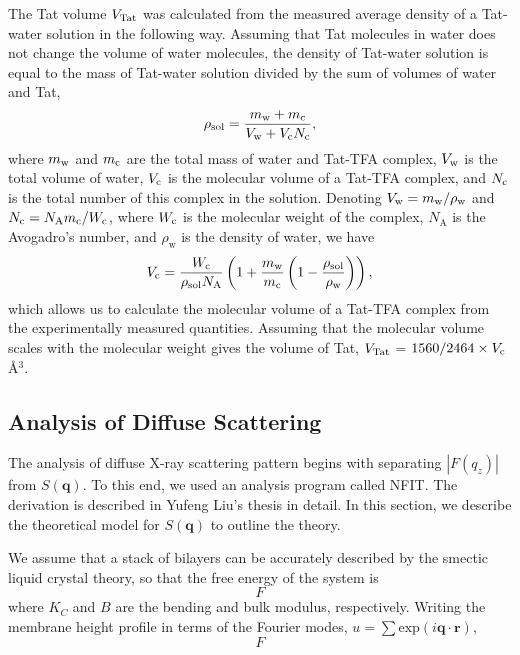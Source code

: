 The Tat volume $V_\textrm{Tat}$ was calculated from the measured average density of a 
Tat-water solution in the following way. Assuming that Tat
molecules in water does not change the volume of water molecules, the density
of Tat-water solution is equal to the mass of Tat-water solution divided
by the sum of volumes of water and Tat, 
\begin{equation}
  \rho_\textrm{sol} = \frac{m_\textrm{w}+m_\textrm{c}}{V_\textrm{w}+V_\textrm{c}N_\textrm{c}},
\end{equation}
where $m_\textrm{w}$ and 
$m_\textrm{c}$
are the total mass of water and Tat-TFA complex, $V_\textrm{w}$ is the total volume of 
water, $V_\textrm{c}$ is the molecular volume of a Tat-TFA complex, and $N_\textrm{c}$ is the total number 
of this complex in the solution. 
Denoting $V_\textrm{w}=m_\textrm{w}/\rho_\textrm{w}$ 
and $N_\textrm{c}=N_\textrm{A}m_\textrm{c}/W_\textrm{c}$, 
where $W_\textrm{c}$ is the molecular weight of the complex, 
$N_\textrm{A}$ is the Avogadro's number,
and $\rho_\textrm{w}$ is the density of water, we have
\begin{equation}
  V_\textrm{c} = \frac{W_\textrm{c}}{\rho_\textrm{sol}N_\textrm{A}} \left( 
        1 + \frac{m_\textrm{w}}{m_\textrm{c}}\left(1-\frac{\rho_\textrm{sol}}{\rho_\textrm{w}}\right) 
        \right),
\end{equation}
which allows us to calculate the molecular volume of a Tat-TFA complex 
from the experimentally measured quantities. 
Assuming that the molecular
volume scales with the molecular weight gives the volume of Tat, 
$V_\textrm{Tat}$ = $1560/2464\times V_\textrm{c}$ \AA$^3$. 

\subsection{Analysis of Diffuse Scattering}
The analysis of diffuse X-ray scattering pattern begins with separating 
$|F(q_z)|$ from $S(\mathbf{q})$. To this end, we used an analysis program
called NFIT. The derivation is described in Yufeng Liu's thesis in detail. 
In this section, we describe the theoretical model for $S(\mathbf{q})$ to 
outline the theory. 

We assume that a stack of bilayers can be accurately
described by the smectic liquid crystal theory, so that the free energy of 
the system is
\begin{equation}
  F
\end{equation}
where $K_C$ and $B$ are the bending and bulk modulus, respectively. 
Writing the membrane height profile in terms of the Fourier modes,
$u=\sum \mathrm{exp}(i\mathbf{q} \cdot \mathbf{r})$, 
\begin{equation}
  F
\end{equation}



